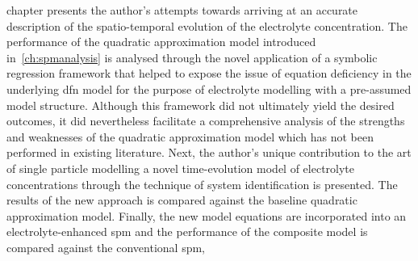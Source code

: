 

 chapter presents the  author's attempts towards arriving at
an  accurate description  of the  spatio-temporal evolution  of the  electrolyte
concentration. The  performance of the quadratic  approximation model introduced
in~\cref{ch:spmanalysis} is analysed through the novel application of a symbolic
regression framework that  helped to expose the issue of  equation deficiency in
the underlying \gls{dfn}  model for the purpose of electrolyte  modelling with a
pre-assumed model  structure. Although this  framework did not  ultimately yield
the desired outcomes, it did nevertheless facilitate a comprehensive analysis of
the strengths and weaknesses of the  quadratic approximation model which has not
been performed in existing literature. Next, the author's unique contribution to
the art  of single  particle modelling  \viz{} a  novel time-evolution  model of
electrolyte  concentrations through  the technique  of system  identification is
presented. The  results of  the new  approach is  compared against  the baseline
quadratic approximation model. Finally, the new model equations are incorporated
into  an electrolyte-enhanced  \gls{spm} and  the performance  of the  composite
model is compared against the conventional \gls{spm},

